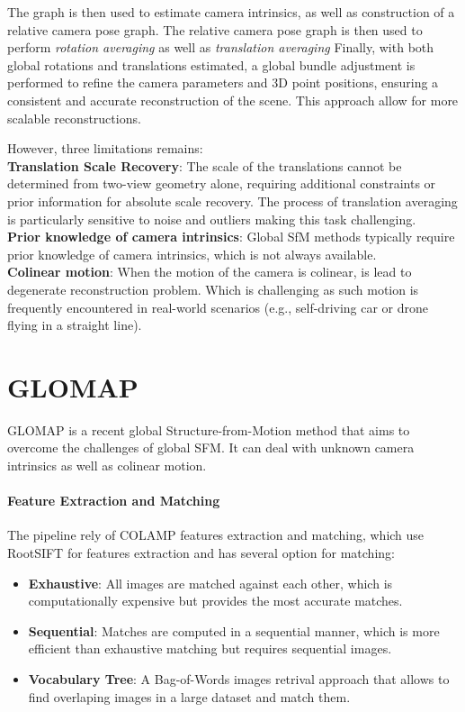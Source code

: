 The graph is then used to estimate camera intrinsics, as well as construction of a relative camera pose graph.
The relative camera pose graph is then used to perform \emph{rotation averaging} as well as \emph{translation averaging} \cite{Chatterjee2013, theia-manual, moulon2016openmvg}
Finally, with both global rotations and translations estimated, a global bundle adjustment is performed to refine the camera parameters and 3D point positions, ensuring a consistent and accurate reconstruction of the scene.
This approach allow for more scalable reconstructions.

However, three limitations remains: \\
\textbf{Translation Scale Recovery}: The scale of the translations cannot be determined from two-view geometry alone, requiring additional constraints or prior information for absolute scale recovery.
The process of translation averaging is particularly sensitive to noise and outliers making this task challenging. \\
\textbf{Prior knowledge of camera intrinsics}: Global SfM methods typically require prior knowledge of camera intrinsics, which is not always available. \\
\textbf{Colinear motion}: When the motion of the camera is colinear, is lead to degenerate reconstruction problem. Which is challenging as such motion is frequently encountered in real-world scenarios (e.g., self-driving car or drone flying in a straight line).

\section{GLOMAP}\label{sec:glomap}

GLOMAP \cite{pan2024glomap} is a recent global Structure-from-Motion method that aims to overcome the challenges of global SFM. It can deal with unknown camera intrinsics as well as colinear motion.

\paragraph{Feature Extraction and Matching}
The pipeline rely of COLAMP features extraction and matching, which use RootSIFT \cite{arrandjelovic2012three} for features extraction and has several option for matching: 
\begin{itemize}
    \item \textbf{Exhaustive}: All images are matched against each other, which is computationally expensive but provides the most accurate matches.
    \item \textbf{Sequential}: Matches are computed in a sequential manner, which is more efficient than exhaustive matching but requires sequential images.
    \item \textbf{Vocabulary Tree}: A Bag-of-Words images retrival approach \cite{schoenberger2016vote} that allows to find overlaping images in a large dataset and match them.
\end{itemize}

